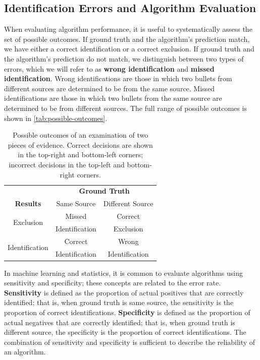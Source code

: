 \documentclass[doubleblind]{elsarticle}\usepackage[]{graphicx}\usepackage[]{color}
\begin{document}
\subsection{Identification Errors and Algorithm Evaluation}

When evaluating algorithm performance, it is useful to systematically assess  the set of possible outcomes. If ground truth and the algorithm's prediction match, we have either a correct identification or a correct exclusion. If ground truth and the algorithm's prediction do not match, we distinguish between two types of errors, which we will refer to as \textbf{wrong identification} and \textbf{missed identification}. Wrong identifications are those in which two bullets from different sources are determined to be from the same source. Missed identifications are those in which two bullets from the same source are determined to be from different sources. The full range of possible outcomes is shown in \autoref{tab:possible-outcomes}.

\begin{table}
\centering
\bgroup
\def\arraystretch{.8}%
\begin{tabular}{|ccc}
\multicolumn{1}{c}{} & \multicolumn{2}{c}{\textbf{Ground Truth}}\\\cline{2-3}
\multicolumn{1}{c}{\textbf{Results}} & \multicolumn{1}{|c}{Same Source} & \multicolumn{1}{|c|}{Different Source} \\\hline
\multirow{2}{*}{Exclusion} & \multicolumn{1}{|c}{Missed} & \multicolumn{1}{|c|}{Correct}\\
   &  \multicolumn{1}{|c}{Identification} & \multicolumn{1}{|c|}{Exclusion}\\\hline
\multirow{2}{*}{Identification}  &  \multicolumn{1}{|c}{Correct} & \multicolumn{1}{|c|}{Wrong}\\
   &  \multicolumn{1}{|c}{Identification} & \multicolumn{1}{|c|}{Identification}\\\hline
\end{tabular}
\egroup
\caption{Possible outcomes of an examination of two pieces of evidence. Correct decisions are shown in the top-right and bottom-left corners; incorrect decisions in the top-left and bottom-right corners.\label{tab:possible-outcomes}}
\end{table}


In machine learning and statistics, it is common to evaluate algorithms using sensitivity and specificity; these concepts are related to the error rate. \textbf{Sensitivity} is defined as the proportion of actual positives that are correctly identified; that is, when ground truth is same source, the sensitivity is the proportion of correct identifications. \textbf{Specificity} is defined as the proportion of actual negatives that are correctly identified; that is, when ground truth is different source, the specificity is the proportion of correct identifications. The combination of sensitivity and specificity is sufficient to describe the reliability of an algorithm. 
\end{document}
